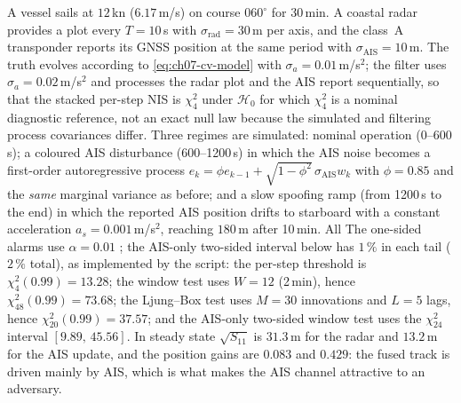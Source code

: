 \documentclass[graybox,envcountchap]{style/SNmono}
\providecommand{\DIFadd}[1]{{\protect\color{blue} #1}} %
\providecommand{\DIFdel}[1]{{\protect\color{red} #1}} %
\providecommand{\DIFaddbegin}{} %
\providecommand{\DIFaddend}{} %
\providecommand{\DIFdelbegin}{} %
\providecommand{\DIFdelend}{} %
\begin{document}
\begin{example}
\label{ex:ch07-ais-innovation}
A vessel sails at $12$\,kn ($6.17$\,m/s) on course $060^{\circ}$ for 30\,min. A coastal radar provides a plot every $T=10$\,s with $\sigma_{\mathrm{rad}}=30$\,m per axis, and the class~A transponder reports its GNSS position at the same period with $\sigma_{\mathrm{AIS}}=10$\,m. The truth evolves according to \eqref{eq:ch07-cv-model} with $\sigma_a=0.01$\,m/s$^{2}$; the filter uses $\sigma_a=0.02$\,m/s$^{2}$ and processes the radar plot and the AIS report sequentially, \DIFdelbegin \DIFdel{so that the stacked per-step NIS is $\chi^{2}_{4}$ under $\mathcal{H}_0$}\DIFdelend \DIFaddbegin \DIFadd{for which $\chi^2_4$ is a nominal diagnostic reference, not an exact null law because the simulated and filtering process covariances differ}\DIFaddend . Three regimes are simulated: nominal operation (0--600\,s); a coloured AIS disturbance (600--1200\,s) in which the AIS noise becomes a first-order autoregressive process $e_k=\phi e_{k-1}+\sqrt{1-\phi^{2}}\,\sigma_{\mathrm{AIS}}w_k$ with $\phi=0.85$ and the \emph{same} marginal variance as before; and a slow spoofing ramp (from 1200\,s to the end) in which the reported AIS position drifts to starboard with a constant acceleration $a_s=0.001$\,m/s$^{2}$, reaching $180$\,m after 10\,min. \DIFdelbegin \DIFdel{All }\DIFdelend \DIFaddbegin \DIFadd{The one-sided }\DIFaddend alarms use $\alpha=0.01$\DIFaddbegin \DIFadd{; the AIS-only two-sided interval below has $1\,\%$ in each tail ($2\,\%$ total), as implemented by the script}\DIFaddend : the per-step threshold is $\chi^{2}_{4}(0.99)=13.28$; the window test uses $W=12$ (2\,min), hence $\chi^{2}_{48}(0.99)=73.68$; the Ljung--Box test uses $M=30$ innovations and $L=5$ lags, hence $\chi^{2}_{20}(0.99)=37.57$; and the AIS-only two-sided window test uses the $\chi^{2}_{24}$ interval $[9.89,\,45.56]$. In steady state $\sqrt{S_{11}}$ is $31.3$\,m for the radar and $13.2$\,m for the AIS update, and the position gains are $0.083$ and $0.429$: the fused track is driven mainly by AIS, which is what makes the AIS channel attractive to an adversary.


\end{example}
\end{document}
